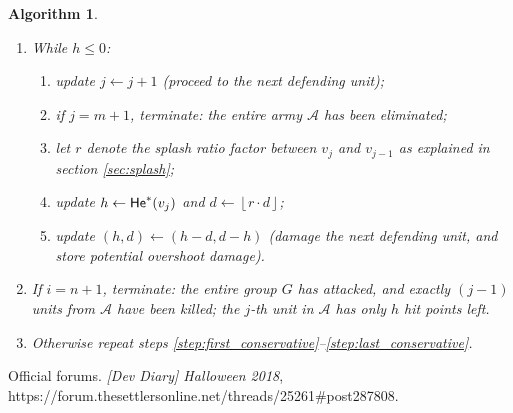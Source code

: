 \documentclass{article}
\newcommand{\floor}[1]{\left\lfloor #1 \right\rfloor}
\renewcommand{\leq}{\leqslant}
\newcommand{\overwr}{\leftarrow}
\newcommand{\cA}{\mathcal{A}}
\DeclareMathOperator{\He}{{\sf He}} %
\newtheorem{algorithm}{Algorithm}
\numberwithin{equation}{section}
\begin{document}
\begin{algorithm}
\begin{enumerate}
        \item While $h \leq 0$:
        \begin{enumerate}
            \item update $j \overwr j + 1$ (proceed to the next defending unit);
            \item if $j = m + 1$, terminate: the entire army $\cA $ has been eliminated;
            \item let $r$ denote the splash ratio factor between $v_j$ and $v_{j - 1}$ as explained in section \ref{sec:splash};
            \item update $h \overwr \He ^* (v_j)$ and $d \overwr \floor{r \cdot d}$;
            \item update $(h, d) \overwr (h - d, d - h)$ (damage the next defending unit, and store potential overshoot damage).
        \end{enumerate}

        \item \label{step:last_conservative} If $i = n + 1$, terminate: the entire group $G$ has attacked, and exactly $(j - 1)$ units from $\cA $ have been killed; the $j$-th unit in $\cA $ has only $h$ hit points left.

        \item Otherwise repeat steps \ref{step:first_conservative}--\ref{step:last_conservative}.
    \end{enumerate}
\end{algorithm}


\begin{thebibliography}{9}
     Official forums. \textit{[Dev Diary] Halloween 2018}, {https://forum.thesettlersonline.net/threads/25261\#post287808}.
\end{thebibliography}
\end{document}
